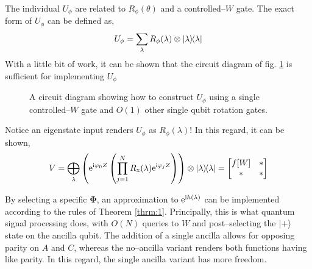 \documentclass{article}
\begin{document}
The individual $U_{\phi}$ are related to $R_\phi(\theta)$ and a controlled--$W$ gate. The exact form of $U_{\phi}$ can be defined as,
\begin{equation}\label{eq:u_phi}
    U_{\phi} = \sum_\lambda R_\phi(\lambda)\otimes \ketbra{\lambda}
\end{equation}
With a little bit of work, it can be shown that the circuit diagram of fig. \ref{fig:u_phi} is sufficient for implementing $U_{\phi}$

\begin{figure}[!ht]
    \centering
    \caption{A circuit diagram showing how to construct $U_{\phi}$ using a single controlled--$W$ gate and $O(1)$ other single qubit rotation gates.}
    \label{fig:u_phi}
\end{figure}

Notice an eigenstate input renders $U_{\phi}$ as $R_\phi(\lambda)$! In this regard, it can be shown,
\begin{equation}
    V = \bigoplus_{\lambda} \left(\mathrm{e}^{\mathrm{i}\varphi_0 Z} \left(\prod_{j=1}^N R_{\textsc{x}}(
    \lambda)\mathrm{e}^{\mathrm{i}\varphi_j Z} \right) \right)\otimes\ketbra{\lambda} = \begin{bmatrix}f[W] & * \\ * & *\end{bmatrix}
\end{equation}


By selecting a specific $\boldsymbol{\Phi}$, an approximation to $\mathrm{e}^{\mathrm{i} h(\lambda)}$ can be implemented according to the rules of Theorem \ref{thrm:1}. Principally, this is what quantum signal processing does, with $O(N)$ queries to $W$ and post--selecting the $\ket{+}$ state on the ancilla qubit. The addition of a single ancilla allows for opposing parity on $A$ and $C$, whereas the no--ancilla variant \cite{LC19} renders both functions having like parity. In this regard, the single ancilla variant has more freedom. 
\end{document}
